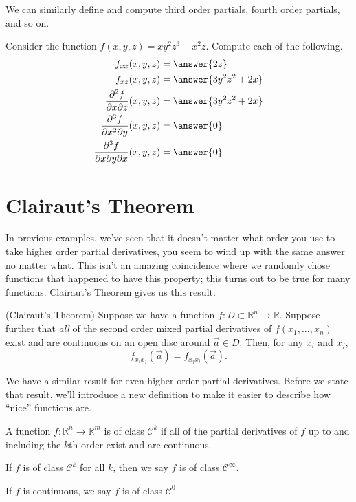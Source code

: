 \documentclass{ximera}
\begin{document}
We can similarly define and compute third order partials, fourth order partials, and so on.

\begin{example}
Consider the function $f(x,y,z) = xy^2z^3 + x^2z$. Compute each of the following.
\begin{align*}
f_{xx}(x,y,z) &= \answer{2z}\\
f_{xz}(x,y,z) &= \answer{3y^2z^2+2x}\\
\frac{\partial^2 f}{\partial x\partial z}(x,y,z) &= \answer{3y^2z^2+2x}\\
\frac{\partial^3 f}{\partial x^2\partial y}(x,y,z) &= \answer{0}\\
\frac{\partial^3 f}{\partial x\partial y\partial x}(x,y,z) &= \answer{0}
\end{align*}
\end{example}

\section*{Clairaut's Theorem}

In previous examples, we've seen that it doesn't matter what order you use to take higher order partial derivatives, you seem to wind up with the same answer no matter what. This isn't an amazing coincidence where we randomly chose functions that happened to have this property; this turns out to be true for many functions. Clairaut's Theorem gives us this result.

\begin{theorem}
(Clairaut's Theorem) Suppose we have a function $f:D\subset \mathbb{R}^n\rightarrow \mathbb{R}$. Suppose further that \emph{all} of the second order mixed partial derivatives of $f(x_1,...,x_n)$ exist and are continuous on an open disc around $\vec{a}\in D$. Then, for any $x_i$ and $x_j$,
\[
f_{x_ix_j}(\vec{a})=f_{x_jx_i}(\vec{a}).
\]
\end{theorem}

We have a similar result for even higher order partial derivatives. Before we state that result, we'll introduce a new definition to make it easier to describe how ``nice'' functions are.

\begin{definition}
A function $f:\mathbb{R}^n\rightarrow\mathbb{R}^m$ is of class $\mathcal{C}^k$ if all of the partial derivatives of $f$ up to and including the $k$th order exist and are continuous.

If $f$ is of class $\mathcal{C}^k$ for all $k$, then we say $f$ is of class $\mathcal{C}^\infty$.

If $f$ is continuous, we say $f$ is of class $\mathcal{C}^0$.
\end{definition}
\end{document}
